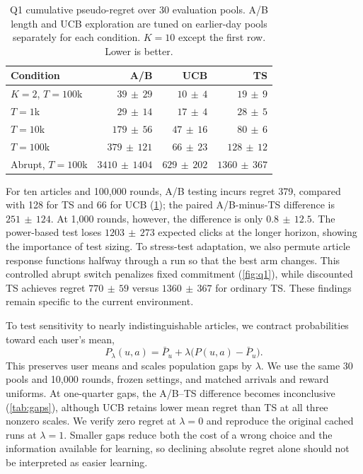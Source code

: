 \documentclass{article}
\newcommand{\ci}[2]{#1\,{\scriptstyle\pm}\,#2}
\begin{document}
\begin{table}[t]
\caption{Q1 cumulative pseudo-regret over 30 evaluation pools. A/B length and UCB exploration are tuned on earlier-day pools separately for each condition. $K=10$ except the first row. Lower is better.}
\label{tab:q1}
\centering
\small
\setlength{\tabcolsep}{3.2pt}
\begin{tabular}{lrrr}
\toprule
Condition & A/B & UCB & TS \\
\midrule
$K=2$, $T=100$k & $\ci{39}{29}$ & $\ci{10}{4}$ & $\ci{19}{9}$ \\
$T=1$k & $\ci{29}{14}$ & $\ci{17}{4}$ & $\ci{28}{5}$ \\
$T=10$k & $\ci{179}{56}$ & $\ci{47}{16}$ & $\ci{80}{6}$ \\
$T=100$k & $\ci{379}{121}$ & $\ci{66}{23}$ & $\ci{128}{12}$ \\
Abrupt, $T=100$k & $\ci{3410}{1404}$ & $\ci{629}{202}$ & $\ci{1360}{367}$ \\
\bottomrule
\end{tabular}
\end{table}

For ten articles and 100,000 rounds, A/B testing incurs regret 379, compared with 128 for TS and 66 for UCB (\cref{tab:q1}); the paired A/B-minus-TS difference is $\ci{251}{124}$. At 1,000 rounds, however, the difference is only $\ci{0.8}{12.5}$. The power-based test loses $\ci{1203}{273}$ expected clicks at the longer horizon, showing the importance of test sizing. To stress-test adaptation, we also permute article response functions halfway through a run so that the best arm changes. This controlled abrupt switch penalizes fixed commitment (\cref{fig:q1}), while discounted TS achieves regret $\ci{770}{59}$ versus $\ci{1360}{367}$ for ordinary TS. These findings remain specific to the current environment.

To test sensitivity to nearly indistinguishable articles, we contract probabilities toward each user's mean,
\begin{equation}
P_\lambda(u,a)=\bar P_u+\lambda\bigl(P(u,a)-\bar P_u\bigr).
\end{equation}
This preserves user means and scales population gaps by $\lambda$. We use the same 30 pools and 10,000 rounds, frozen settings, and matched arrivals and reward uniforms. At one-quarter gaps, the A/B--TS difference becomes inconclusive (\cref{tab:gaps}), although UCB retains lower mean regret than TS at all three nonzero scales. We verify zero regret at $\lambda=0$ and reproduce the original cached runs at $\lambda=1$. Smaller gaps reduce both the cost of a wrong choice and the information available for learning, so declining absolute regret alone should not be interpreted as easier learning.
\end{document}
